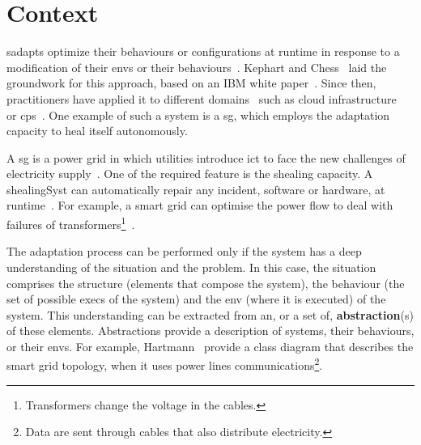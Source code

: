 \section{Context}

\Glspl{sadapt} optimize their \glspl{behaviour} or configurations at runtime in response to a modification of their \glspl{env} or their \glspl{behaviour}~\cite{DBLP:conf/dagstuhl/ChengLGIMABBBCSDFGGGKKKLMMMPSTTWW09}.
Kephart and Chess~\cite{DBLP:journals/computer/KephartC03} laid the groundwork for this approach, based on an IBM white paper~\cite{computing2006architectural}.
Since then, practitioners have applied it to different domains~\cite{DBLP:journals/corr/abs-1904-01518} such as cloud infrastructure~\cite{DBLP:conf/icac/JavadiG17, OpenStack:Watcher:Wiki, DBLP:conf/icse/BarnaKFL17} or \gls{cps}~\cite{DBLP:conf/icac/LalandaGC17, DBLP:conf/cbse/FouquetMFBPJ12, DBLP:conf/smartgridsec/0001FKNT14}.
One example of such a system is a \gls{sg}, which employs the adaptation capacity to heal itself autonomously.

A \gls{sg} is a power grid in which utilities introduce \gls{ict} to face the new challenges of electricity supply~\cite{farhangi2010path, ipakchi2009grid, DBLP:journals/comsur/FangMXY12}.
One of the required feature is the \gls{shealing} capacity.
A \gls{shealingSyst} can automatically repair any incident, software or hardware, at runtime~\cite{DBLP:journals/computer/KephartC03}.
For example, a smart grid can optimise the power flow to deal with failures of transformers\footnote{Transformers change the voltage in the cables.}~\cite{DBLP:journals/comsur/FangMXY12}.

The adaptation process can be performed only if the system has a deep understanding of the situation and the problem.
In this case, the situation comprises the \gls{structure} (elements that compose the system), the \gls{behaviour} (the set of possible \glspl{exec} of the system) and the \gls{env} (where it is executed) of the system.
This understanding can be extracted from an, or a set of, \textbf{abstraction}(s) of these elements.
Abstractions provide a description of systems, their \glspl{behaviour}, or their \glspl{env}.
For example, Hartmann~\etal \cite{DBLP:conf/smartgridcomm/0001FKTPTR14} provide a class diagram that describes the smart grid topology, when it uses power lines communications\footnote{Data are sent through cables that also distribute electricity.}.

